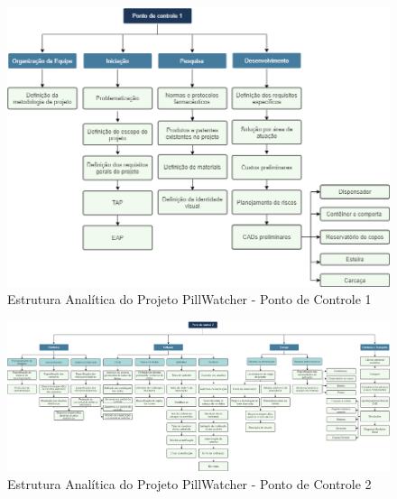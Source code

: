 \begin{apendicesenv}
\begin{figure}[H]
    \centering
    \includegraphics[width=\textwidth]{figuras/eap_pc1.png}
    \caption{Estrutura Analítica do Projeto PillWatcher - Ponto de Controle 1 }
    \label{fig:eap_pc1}
\end{figure}

\begin{landscape}
\begin{figure}[H]
    \centering
    \vspace{1cm}
    \hspace{-1cm}
    \includegraphics[scale=0.3]{figuras/eap_pc2.png}
    \caption{Estrutura Analítica do Projeto PillWatcher - Ponto de Controle 2 }
    \vspace{-5pt}
    \label{fig:eap_pc2}
\end{figure}
\end{landscape}


\end{apendicesenv}
